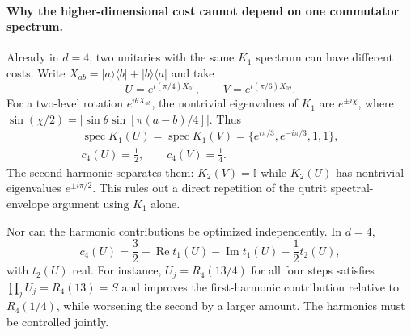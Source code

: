 \documentclass[aps,prl,reprint,superscriptaddress,nofootinbib]{revtex4-2}
\newcommand{\spec}{\operatorname{spec}}
\newcommand{\id}{\mathbb{I}}
\newcommand{\ket}[1]{\lvert #1\rangle}
\newcommand{\bra}[1]{\langle #1\rvert}
\begin{document}
\paragraph{Why the higher-dimensional cost cannot depend on one commutator spectrum.}
Already in $d=4$, two unitaries with the same $K_1$ spectrum can have different costs. Write
$X_{ab}=\ket a\bra b+\ket b\bra a$ and take
\begin{equation}
U=e^{i(\pi/4)X_{01}},\qquad V=e^{i(\pi/6)X_{02}}.
\end{equation}
For a two-level rotation $e^{i\theta X_{ab}}$, the nontrivial eigenvalues of $K_1$ are $e^{\pm i\chi}$, where
$\sin(\chi/2)=|\sin\theta\sin[\pi(a-b)/4]|$.
Thus
\begin{equation}
\begin{gathered}
\spec K_1(U)=\spec K_1(V)
=\{e^{i\pi/3},e^{-i\pi/3},1,1\},\\
c_4(U)=\frac12,\qquad c_4(V)=\frac14.
\end{gathered}
\label{eqS:d4ex}
\end{equation}
The second harmonic separates them: $K_2(V)=\id$ while $K_2(U)$ has nontrivial eigenvalues $e^{\pm i\pi/2}$. This rules out a direct repetition of the qutrit spectral-envelope argument using $K_1$ alone.

Nor can the harmonic contributions be optimized independently. In $d=4$,
\begin{equation}
c_4(U)=\frac32-\operatorname{Re}t_1(U)
-\operatorname{Im}t_1(U)-\frac12t_2(U),
\label{eqS:d4harm}
\end{equation}
with $t_2(U)$ real. For instance, $U_j=R_4(13/4)$ for all four steps satisfies $\prod_jU_j=R_4(13)=S$ and improves the first-harmonic contribution relative to $R_4(1/4)$, while worsening the second by a larger amount. The harmonics must be controlled jointly.
\end{document}
